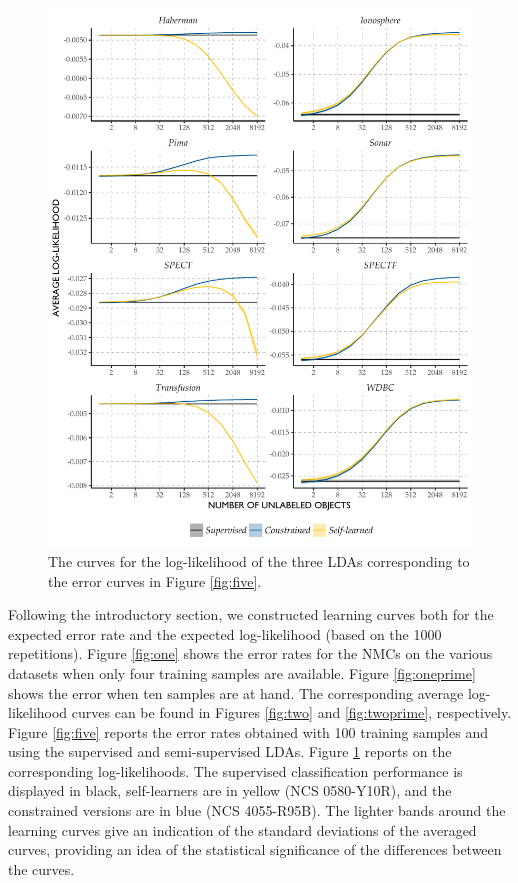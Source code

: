\documentclass[twoside]{memoir}\usepackage[]{graphicx}\usepackage{xcolor}
\makeatletter
\def\maxwidth{ %
  \ifdim\Gin@nat@width>\linewidth
    \linewidth
  \else
    \Gin@nat@width
  \fi
}
\newenvironment{knitrout}{}{} %
\makeatother
\begin{document}
\begin{knitrout}
\color{fgcolor}\begin{figure}
\includegraphics[width=\maxwidth]{figure/fiveprime-1} \caption{The curves for the log-likelihood of the three LDAs corresponding to the error curves in Figure \ref{fig:five}. }\label{fig:fiveprime}
\end{figure}


\end{knitrout}



Following the introductory section, we constructed learning curves both for the expected error rate and the expected log-likelihood (based on the 1000 repetitions).  Figure \ref{fig:one} shows the error rates for the NMCs on the various datasets when only four training samples are available.  Figure \ref{fig:oneprime} shows the error when ten samples are at hand.  The corresponding average log-likelihood curves can be found in Figures \ref{fig:two} and \ref{fig:twoprime}, respectively.  Figure \ref{fig:five} reports the error rates obtained with 100 training samples and using the supervised and semi-supervised LDAs.  Figure \ref{fig:fiveprime} reports on the corresponding log-likelihoods.   The supervised classification performance is displayed in black, self-learners are in yellow (NCS 0580-Y10R), and the constrained versions are in blue (NCS 4055-R95B). The lighter bands around the learning curves give an indication of the standard deviations of the averaged curves, providing an idea of the statistical significance of the differences between the curves.
\end{document}
